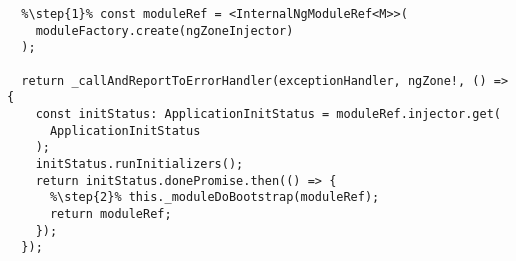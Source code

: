 \begin{verbatim}
  %\step{1}% const moduleRef = <InternalNgModuleRef<M>>(
    moduleFactory.create(ngZoneInjector)
  );

  return _callAndReportToErrorHandler(exceptionHandler, ngZone!, () => {
    const initStatus: ApplicationInitStatus = moduleRef.injector.get(
      ApplicationInitStatus
    );
    initStatus.runInitializers();
    return initStatus.donePromise.then(() => {
      %\step{2}% this._moduleDoBootstrap(moduleRef);
      return moduleRef;
    });
  });
\end{verbatim}
